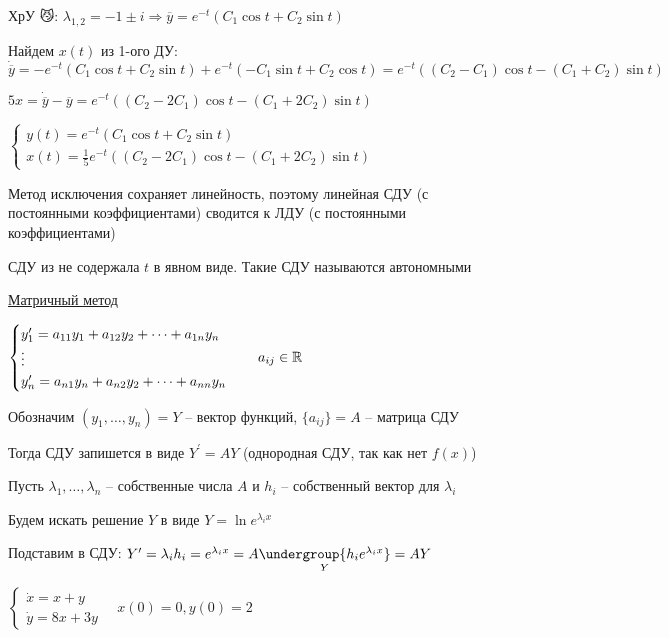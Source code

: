 \documentclass[12pt]{article}
\begin{document}
    ХрУ 😼: $\lambda_{1,2} = -1 \pm i \Longrightarrow \overline{y} = e^{-t} (C_1 \cos t + C_2 \sin t)$

    Найдем $x(t)$ из 1-ого ДУ: $\dot{\overline{y}} = -e^{-t} (C_1 \cos t + C_2 \sin t) + e^{-t} (-C_1 \sin t + C_2 \cos t) = e^{-t} ((C_2 - C_1) \cos t - (C_1 + C_2) \sin t)$

    $5x = \dot{\overline{y}} - \overline{y} = e^{-t} ((C_2 - 2C_1) \cos t - (C_1 + 2C_2) \sin t)$

    $\begin{cases}
         y(t) = e^{-t} (C_1 \cos t + C_2 \sin t) \\
         x(t) = \frac{1}{5} e^{-t} ((C_2 - 2C_1) \cos t - (C_1 + 2C_2) \sin t)
    \end{cases}$

    \Nota Метод исключения сохраняет линейность, поэтому линейная СДУ (с постоянными коэффициентами) сводится к ЛДУ (с постоянными коэффициентами)

    \Nota СДУ из \Exs не содержала $t$ в явном виде. Такие СДУ называются автономными

    \mediumvspace

    \hypertarget{matrixmethod}{}

    \underline{Матричный метод}

    $\begin{cases}
         y^{\prime}_1 = a_{11}y_1 + a_{12}y_2 + \dots + a_{1n} y_n \\
         \vdots \\
         y^{\prime}_n = a_{n1}y_n + a_{n2}y_2 + \dots + a_{nn} y_n
    \end{cases} \quad a_{ij} \in \mathbb{R}$

    Обозначим $(y_1, \dots, y_n) = Y$ -- вектор функций, $\{a_{ij}\} = A$ -- матрица СДУ

    Тогда СДУ запишется в виде $Y^\prime = AY$ (однородная СДУ, так как нет $f(x)$)

    Пусть $\lambda_1, \dots, \lambda_n$ -- собственные числа $A$ и $h_i$ -- собственный вектор для $\lambda_i$

    Будем искать решение $Y$ в виде $Y = \ln e^{\lambda_i x}$

    Подставим в СДУ: $Y^\prime = \lambda_i h_i = e^{\lambda_i x} = A \underset{Y}{\undergroup{h_i e^{\lambda_i x}}} = AY$

    \Ex
    $\begin{cases}
         \dot x = x + y \\
         \dot y = 8x + 3y
    \end{cases} \quad x(0) = 0, y(0) = 2$
\end{document}
